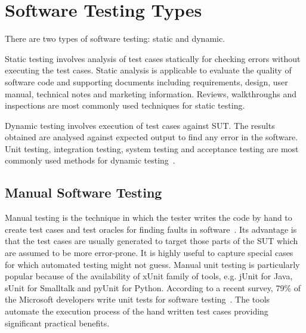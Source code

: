 

\section{Software Testing Types}
There are two types of software testing: static and dynamic.

Static testing involves analysis of test cases statically for checking errors without executing the test cases. Static analysis is applicable to evaluate the quality of software code and supporting documents including requirements, design, user manual, technical notes and marketing information. Reviews, walkthroughs and inspections are most commonly used techniques for static testing.

Dynamic testing involves execution of test cases against SUT. The results obtained are analysed against expected output to find any error in the software. Unit testing, integration testing, system testing and acceptance testing are most commonly used methods for dynamic testing~\cite{fairley1978tutorial}.


\subsection{Manual Software Testing}
Manual testing is the technique in which the tester writes the code by hand to create test cases and test oracles for finding faults in software~\cite{ciupa2008finding}. Its advantage is that the test cases are usually generated to target those parts of the SUT which are assumed to be more error-prone. It is highly useful to capture special cases for which automated testing might not guess. Manual unit testing is particularly popular because of the availability of xUnit family of tools, e.g. jUnit for Java, sUnit for Smalltalk and pyUnit for Python. According to a recent survey, 79\% of the Microsoft developers write unit tests for software testing~\cite{leitner2009effectiveness}. The tools automate the execution process of the hand written test cases providing significant practical benefits.  

